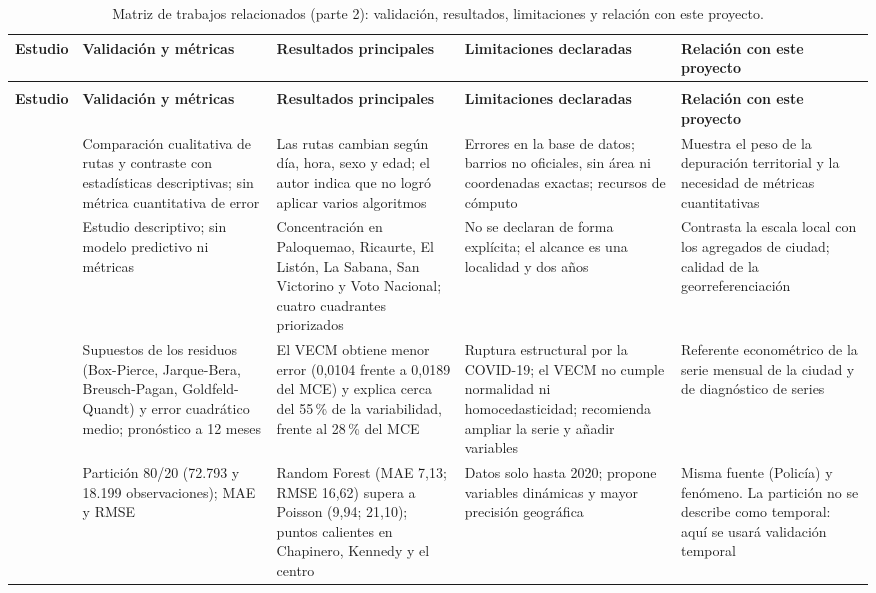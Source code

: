 {\begin{longtable}{@{}>{\raggedright\arraybackslash}p{2.2cm}>{\raggedright\arraybackslash}p{3.1cm}>{\raggedright\arraybackslash}p{3.3cm}>{\raggedright\arraybackslash}p{3.0cm}>{\raggedright\arraybackslash}p{2.9cm}@{}}
\caption{Matriz de trabajos relacionados (parte 2): validación, resultados, limitaciones y relación con este proyecto.}\label{tab:matriz-resultados}\\
\toprule
\textbf{Estudio} & \textbf{Validación y métricas} & \textbf{Resultados principales} & \textbf{Limitaciones declaradas} & \textbf{Relación con este proyecto} \\
\midrule
\endfirsthead
\multicolumn{5}{@{}l}{\emph{Tabla~\ref{tab:matriz-resultados} (continuación)}}\\
\toprule
\textbf{Estudio} & \textbf{Validación y métricas} & \textbf{Resultados principales} & \textbf{Limitaciones declaradas} & \textbf{Relación con este proyecto} \\
\midrule
\endhead
\bottomrule
\endfoot
\citet{campo2017} & Comparación cualitativa de rutas y contraste con estadísticas descriptivas; sin métrica cuantitativa de error & Las rutas cambian según día, hora, sexo y edad; el autor indica que no logró aplicar varios algoritmos & Errores en la base de datos; barrios no oficiales, sin área ni coordenadas exactas; recursos de cómputo & Muestra el peso de la depuración territorial y la necesidad de métricas cuantitativas \\
\addlinespace
\citet{fonseca2019} & Estudio descriptivo; sin modelo predictivo ni métricas & Concentración en Paloquemao, Ricaurte, El Listón, La Sabana, San Victorino y Voto Nacional; cuatro cuadrantes priorizados & No se declaran de forma explícita; el alcance es una localidad y dos años & Contrasta la escala local con los agregados de ciudad; calidad de la georreferenciación \\
\addlinespace
\citet{garzon2025} & Supuestos de los residuos (Box-Pierce, Jarque-Bera, Breusch-Pagan, Goldfeld-Quandt) y error cuadrático medio; pronóstico a 12 meses & El VECM obtiene menor error (0,0104 frente a 0,0189 del MCE) y explica cerca del 55\,\% de la variabilidad, frente al 28\,\% del MCE & Ruptura estructural por la COVID-19; el VECM no cumple normalidad ni homocedasticidad; recomienda ampliar la serie y añadir variables & Referente econométrico de la serie mensual de la ciudad y de diagnóstico de series \\
\addlinespace
\citet{martinez2025} & Partición 80/20 (72.793 y 18.199 observaciones); MAE y RMSE & Random Forest (MAE 7,13; RMSE 16,62) supera a Poisson (9,94; 21,10); puntos calientes en Chapinero, Kennedy y el centro & Datos solo hasta 2020; propone variables dinámicas y mayor precisión geográfica & Misma fuente (Policía) y fenómeno. La partición no se describe como temporal: aquí se usará validación temporal \\

\end{longtable}}
